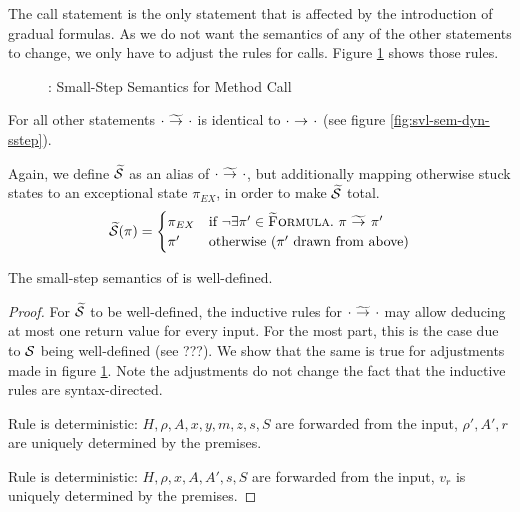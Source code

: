 The call statement is the only statement that is affected by the introduction of gradual formulas.
As we do not want the semantics of any of the other statements to change, we only have to adjust the rules for calls.
Figure \ref{fig:gvl-sem-dyn-sstep} shows those rules.
\begin{figure}
    \boxed{\gsstep{\pi}{\pi}}
    
    \caption{\gvlidf: Small-Step Semantics for Method Call}
    \label{fig:gvl-sem-dyn-sstep}
\end{figure}
For all other statements ${\cdot} \,\,{\widetilde{\rightarrow}^{}}\,\, {\cdot}$ is identical to ${\cdot} \,\,{\rightarrow^{}}\,\, {\cdot}$ (see figure \ref{fig:svl-sem-dyn-sstep}).

Again, we define $\widetilde{\mathcal{S}}$ as an alias of ${\cdot} \,\,{\widetilde{\rightarrow}^{}}\,\, {\cdot}$, but additionally mapping otherwise stuck states to an exceptional state $\pi_{EX}$, in order to make $\widetilde{\mathcal{S}}$ total.
\begin{displaymath}
\widetilde{\mathcal{S}}(\pi) = 
\begin{cases}
	\pi_{EX} & \text {if } \neg \exists \pi' \in \textup{\textsc{\ensuremath{\widetilde{\text{F}}}ormula}}.~ {\pi} \,\,{\widetilde{\rightarrow}^{}}\,\, {\pi'} \\
	\pi'     & \text {otherwise ($\pi'$ drawn from above)}
\end{cases}
\end{displaymath}


\begin{lemma}
    The small-step semantics of \gvlidf is well-defined.
\end{lemma}
\begin{proof}
    For $\widetilde{\mathcal{S}}$ to be well-defined, the inductive rules for ${\cdot} \,\,{\widetilde{\rightarrow}^{}}\,\, {\cdot}$ may allow deducing at most one return value for every input.
    For the most part, this is the case due to $\mathcal{S}$ being well-defined (see ???).
    We show that the same is true for adjustments made in figure \ref{fig:gvl-sem-dyn-sstep}.
    Note the adjustments do not change the fact that the inductive rules are syntax-directed.
    
    Rule  is deterministic:
    $H, \rho, A, x, y, m, z, s, S$ are forwarded from the input, $\rho', A', r$ are uniquely determined by the premises.
    
    Rule  is deterministic:
    $H, \rho, x, A, A', s, S$ are forwarded from the input, $v_r$ is uniquely determined by the premises.
\end{proof}

